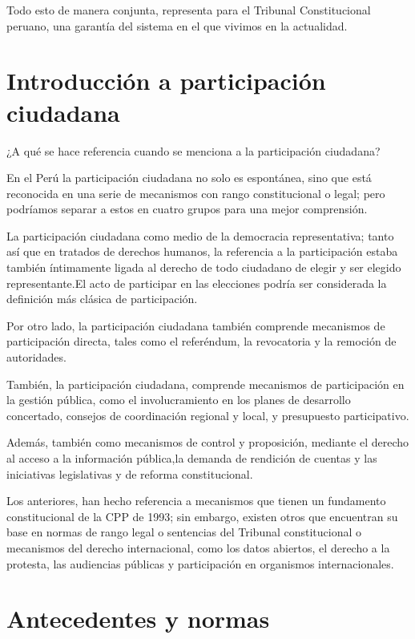 \documentclass[
]{book}
\begin{document}
Todo esto de manera conjunta, representa para el Tribunal Constitucional peruano, una garantía del sistema en el que vivimos en la actualidad.

\hypertarget{introducciuxf3n-a-participaciuxf3n-ciudadana}{%
\section{Introducción a participación ciudadana}\label{introducciuxf3n-a-participaciuxf3n-ciudadana}}

¿A qué se hace referencia cuando se menciona a la participación ciudadana?

En el Perú la participación ciudadana no solo es espontánea, sino que está reconocida en una serie de mecanismos con rango constitucional o legal; pero podríamos separar a estos en cuatro grupos para una mejor comprensión.

La participación ciudadana como medio de la democracia representativa; tanto así que en tratados de derechos humanos, la referencia a la participación estaba también íntimamente ligada al derecho de todo ciudadano de elegir y ser elegido representante.El acto de participar en las elecciones podría ser considerada la definición más clásica de participación.

Por otro lado, la participación ciudadana también comprende mecanismos de participación directa, tales como el referéndum, la revocatoria y la remoción de autoridades.

También, la participación ciudadana, comprende mecanismos de participación en la gestión pública, como el involucramiento en los planes de desarrollo concertado, consejos de coordinación regional y local, y presupuesto participativo.

Además, también como mecanismos de control y proposición, mediante el derecho al acceso a la
información pública,la demanda de rendición de cuentas y las iniciativas legislativas y de reforma constitucional.

Los anteriores, han hecho referencia a mecanismos que tienen un fundamento constitucional de la CPP de 1993; sin embargo, existen otros que encuentran su base en normas de rango legal o sentencias del Tribunal constitucional o mecanismos del derecho internacional, como los datos abiertos, el derecho a la protesta, las audiencias públicas y participación en organismos internacionales.

\hypertarget{antecedentes-y-normas}{%
\section{Antecedentes y normas}\label{antecedentes-y-normas}}
\end{document}
